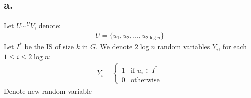 \documentclass[11pt]{article}
\theoremstyle{plain}
\theoremstyle{nonumberplainnobrackets}
\begin{document}
\subsection*{a.}
%
Let $U\sim^{U} V$, denote:
\begin{align*}
U = \{ u_1,u_2,\ldots,u_{2\log n}	 \}
\end{align*}
Let $I^*$ be the IS of size $k$ in $G$. We denote $2\log n$ random variables $Y_i$, for each $1\le i \le 2 \log n$:
	\begin{align*}
Y_i = \begin{cases}
1  & \text{if } u_i\in I^* \\
0  & \text{otherwise}
\end{cases} 
\end{align*}
Denote new random variable
\end{document}
